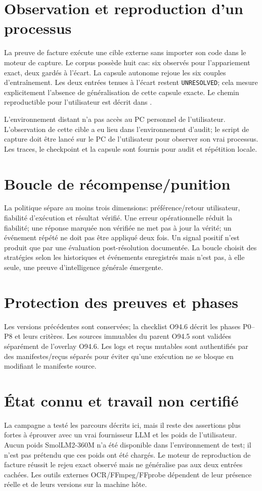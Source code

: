 \documentclass[11pt,a4paper]{article}
\begin{document}
\section{Observation et reproduction d'un processus}
La preuve de facture exécute une cible externe sans importer son code dans le moteur de capture. Le corpus possède huit cas: six observés pour l'appariement exact, deux gardés à l'écart. La capsule autonome rejoue les six couples d'entraînement. Les deux entrées tenues à l'écart restent \texttt{UNRESOLVED}; cela mesure explicitement l'absence de généralisation de cette capsule exacte. Le chemin reproductible pour l'utilisateur est décrit dans .

L'environnement distant n'a pas accès au PC personnel de l'utilisateur. L'observation de cette cible a eu lieu dans l'environnement d'audit; le script de capture doit être lancé sur le PC de l'utilisateur pour observer son vrai processus. Les traces, le checkpoint et la capsule sont fournis pour audit et répétition locale.

\section{Boucle de récompense/punition}
La politique sépare au moins trois dimensions: préférence/retour utilisateur, fiabilité d'exécution et résultat vérifié. Une erreur opérationnelle réduit la fiabilité; une réponse marquée non vérifiée ne met pas à jour la vérité; un événement répété ne doit pas être appliqué deux fois. Un signal positif n'est produit que par une évaluation post-résolution documentée. La boucle choisit des stratégies selon les historiques et événements enregistrés mais n'est pas, à elle seule, une preuve d'intelligence générale émergente.

\section{Protection des preuves et phases}
Les versions précédentes sont conservées; la checklist O94.6 décrit les phases P0--P8 et leurs critères. Les sources immuables du parent O94.5 sont validées séparément de l'overlay O94.6. Les logs et reçus mutables sont authentifiés par des manifestes/reçus séparés pour éviter qu'une exécution ne se bloque en modifiant le manifeste source.

\section{État connu et travail non certifié}
La campagne a testé les parcours décrits ici, mais il reste des assertions plus fortes à éprouver avec un vrai fournisseur LLM et les poids de l'utilisateur. Aucun poids SmolLM2-360M n'a été disponible dans l'environnement de test; il n'est pas prétendu que ces poids ont été chargés. Le moteur de reproduction de facture réussit le rejeu exact observé mais ne généralise pas aux deux entrées cachées. Les outils externes OCR/FFmpeg/FFprobe dépendent de leur présence réelle et de leurs versions sur la machine hôte.
\end{document}
